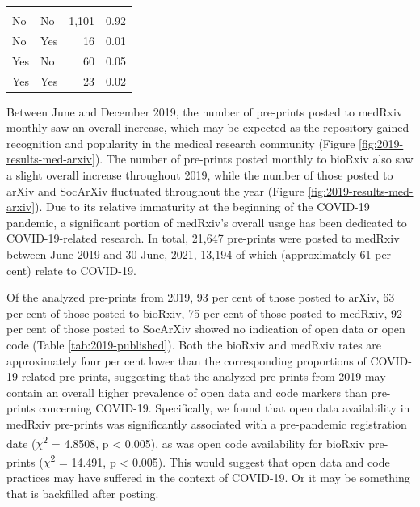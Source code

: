 \documentclass[
]{article}
\begin{document}
\begin{table}
\begin{tabular}[t]{llrr}
\addlinespace[0.3em]
\multicolumn{4}{l}{\textbf{SocArXiv}}\\
\hspace{1em}No & No & 1,101 & 0.92\\
\hspace{1em}No & Yes & 16 & 0.01\\
\hspace{1em}Yes & No & 60 & 0.05\\
\hspace{1em}Yes & Yes & 23 & 0.02\\
\bottomrule
\end{tabular}
\end{table}

Between June and December 2019, the number of pre-prints posted to medRxiv monthly saw an overall increase, which may be expected as the repository gained recognition and popularity in the medical research community (Figure \ref{fig:2019-results-med-arxiv}). The number of pre-prints posted monthly to bioRxiv also saw a slight overall increase throughout 2019, while the number of those posted to arXiv and SocArXiv fluctuated throughout the year (Figure \ref{fig:2019-results-med-arxiv}). Due to its relative immaturity at the beginning of the COVID-19 pandemic, a significant portion of medRxiv's overall usage has been dedicated to COVID-19-related research. In total, 21,647 pre-prints were posted to medRxiv between June 2019 and 30 June, 2021, 13,194 of which (approximately 61 per cent) relate to COVID-19.

Of the analyzed pre-prints from 2019, 93 per cent of those posted to arXiv, 63 per cent of those posted to bioRxiv, 75 per cent of those posted to medRxiv, 92 per cent of those posted to SocArXiv showed no indication of open data or open code (Table \ref{tab:2019-published}). Both the bioRxiv and medRxiv rates are approximately four per cent lower than the corresponding proportions of COVID-19-related pre-prints, suggesting that the analyzed pre-prints from 2019 may contain an overall higher prevalence of open data and code markers than pre-prints concerning COVID-19. Specifically, we found that open data availability in medRxiv pre-prints was significantly associated with a pre-pandemic registration date (\(\chi\)\textsuperscript{2} = 4.8508, p \textless{} 0.005), as was open code availability for bioRxiv pre-prints (\(\chi\)\textsuperscript{2} = 14.491, p \textless{} 0.005). This would suggest that open data and code practices may have suffered in the context of COVID-19. Or it may be something that is backfilled after posting.
\end{document}
